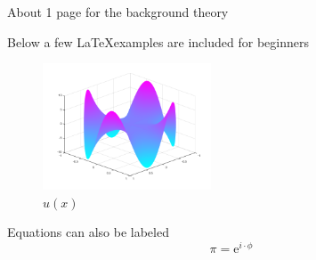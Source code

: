 About 1 page for the background theory

\pagebreak[1]

\iffalse
Below a few \LaTeX examples are included for beginners
\begin{figure}[ht]
    \centering
    \includegraphics[width=5cm]{images/swing_function_plot.png}
    \caption{$u(x)$}%
    \label{fig:swingPlot}
\end{figure}


Equations can also be labeled
\begin{equation}
    \pi = \mathrm{e}^{i\cdot\phi}
    \label{eq:equation1}
\end{equation}


